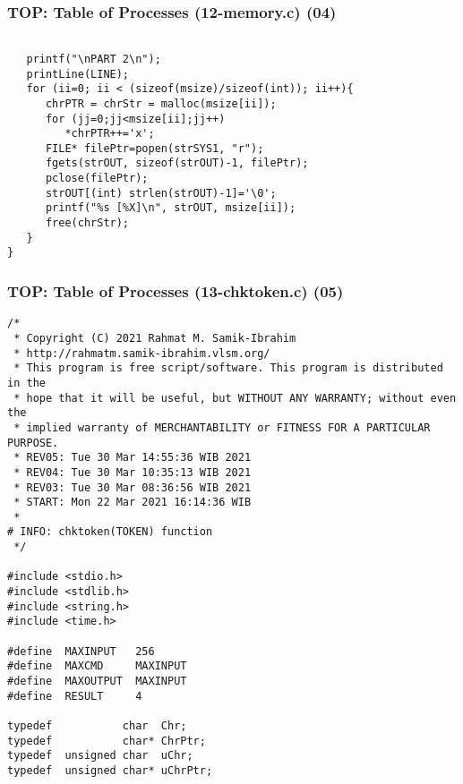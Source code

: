 \documentclass[xcolor=table, notheorems, hyperref={pdfpagelabels=false}]{beamer}
\begin{document}
\begin{frame}[fragile]
\frametitle{TOP: Table of Processes (12-memory.c) (04)}
\begin{lstlisting}[basicstyle=\ttfamily\footnotesize]

   printf("\nPART 2\n");
   printLine(LINE);
   for (ii=0; ii < (sizeof(msize)/sizeof(int)); ii++){
      chrPTR = chrStr = malloc(msize[ii]);
      for (jj=0;jj<msize[ii];jj++)
         *chrPTR++='x';
      FILE* filePtr=popen(strSYS1, "r");
      fgets(strOUT, sizeof(strOUT)-1, filePtr);
      pclose(filePtr);
      strOUT[(int) strlen(strOUT)-1]='\0';
      printf("%s [%X]\n", strOUT, msize[ii]);
      free(chrStr);
   }
}

\end{lstlisting}
\end{frame}

\begin{frame}[fragile]
\frametitle{TOP: Table of Processes (13-chktoken.c) (05)}
\begin{lstlisting}[basicstyle=\ttfamily\tiny]
/*
 * Copyright (C) 2021 Rahmat M. Samik-Ibrahim
 * http://rahmatm.samik-ibrahim.vlsm.org/
 * This program is free script/software. This program is distributed in the 
 * hope that it will be useful, but WITHOUT ANY WARRANTY; without even the 
 * implied warranty of MERCHANTABILITY or FITNESS FOR A PARTICULAR PURPOSE.
 * REV05: Tue 30 Mar 14:55:36 WIB 2021
 * REV04: Tue 30 Mar 10:35:13 WIB 2021
 * REV03: Tue 30 Mar 08:36:56 WIB 2021
 * START: Mon 22 Mar 2021 16:14:36 WIB
 *
# INFO: chktoken(TOKEN) function
 */

#include <stdio.h>
#include <stdlib.h>
#include <string.h>
#include <time.h>

#define  MAXINPUT   256
#define  MAXCMD     MAXINPUT
#define  MAXOUTPUT  MAXINPUT
#define  RESULT     4

typedef           char  Chr;
typedef           char* ChrPtr;
typedef  unsigned char  uChr;
typedef  unsigned char* uChrPtr;

\end{lstlisting}
\end{frame}
\end{document}
